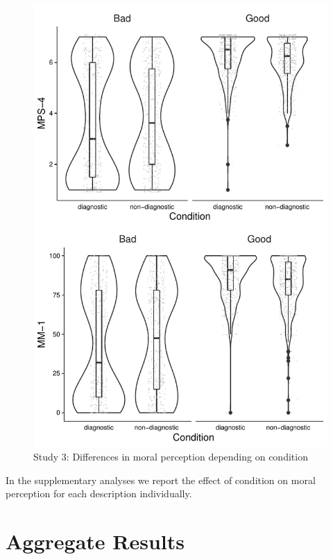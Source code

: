 \documentclass[
  english,
  man,floatsintext]{apa7}
\begin{document}
\begin{figure}
\centering
\includegraphics{moral_dilution_in_chunks_files/figure-latex/S5bothconditionplot-1.pdf}
\caption{\label{fig:S5bothconditionplot}Study 3: Differences in moral perception depending on condition}
\end{figure}

In the supplementary analyses we report the effect of condition on moral perception for each description individually.

\newpage

\hypertarget{aggregate-results}{%
\section{Aggregate Results}\label{aggregate-results}}
\end{document}
